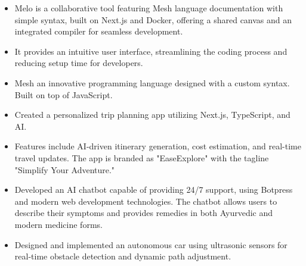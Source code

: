 \documentclass[10pt,a4paper,ragged2e]{altacv}
\begin{document}
\begin{itemize} 
    \item Melo is a collaborative tool featuring Mesh language documentation with simple syntax, built on Next.js and Docker, offering a shared canvas and an integrated compiler for seamless development.  
    \item It provides an intuitive user interface, streamlining the coding process and reducing setup time for developers.  
\end{itemize}

 \begin{itemize}
 \item Mesh an innovative programming language designed with a custom syntax.
     Built on top of JavaScript.
 \end{itemize}


 \begin{itemize} \item Created a personalized trip planning app utilizing Next.js, TypeScript, and AI. 
\item Features include AI-driven itinerary generation, cost estimation, and real-time travel updates. The app is branded as "EaseExplore" with the tagline "Simplify Your Adventure." \end{itemize}


 \begin{itemize} \item Developed an AI chatbot capable of providing 24/7 support, using Botpress and modern web development technologies. The chatbot allows users to describe their symptoms and provides remedies in both Ayurvedic and modern medicine forms. \end{itemize}



\begin{itemize}
\item  Designed and implemented an autonomous car using ultrasonic sensors for real-time obstacle detection and dynamic path adjustment.

\end{itemize}
\end{document}
